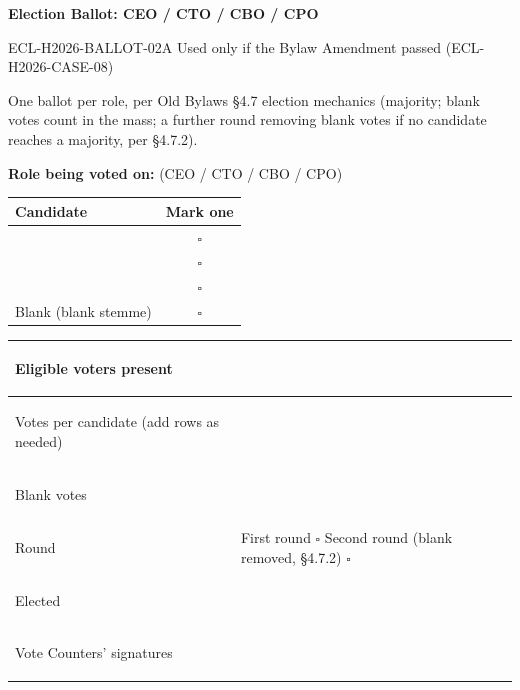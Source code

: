 \documentclass{../../../Common/Latex/Templates/rapport}
\date{[DATE OF GENERAL ASSEMBLY: TBD]}
\begin{document}
\reportmainmatter
\small
\setlength{\parindent}{0pt}
\setlength{\tabcolsep}{6pt}
\renewcommand{\arraystretch}{1.3}

\begin{center}
  {\Large\bfseries Election Ballot: CEO / CTO / CBO / CPO}\par
  \vspace{0.15cm}
  {\normalsize ECL-H2026-BALLOT-02A \quad Used only if the Bylaw Amendment passed (ECL-H2026-CASE-08)}\par
\end{center}

\vspace{0.2cm}
One ballot per role, per Old Bylaws \S4.7 election mechanics (majority; blank votes count in the mass; a further round removing blank votes if no candidate reaches a majority, per \S4.7.2).

\vspace{0.3cm}
\textbf{Role being voted on:} \underline{\hspace{6cm}} \quad (CEO / CTO / CBO / CPO)

\vspace{0.4cm}
\begin{tabularx}{\textwidth}{|>{\raggedright\arraybackslash}X|c|}
  \hline
  \bfseries Candidate  & \bfseries Mark one \\
  \hline
  \rule{0pt}{0.9cm}    & $\square$          \\
  \hline
  \rule{0pt}{0.9cm}    & $\square$          \\
  \hline
  \rule{0pt}{0.9cm}    & $\square$          \\
  \hline
  Blank (blank stemme) & $\square$          \\
  \hline
\end{tabularx}

\vspace{0.6cm}
\begin{tabularx}{\textwidth}{|>{\bfseries\raggedright\arraybackslash}p{5.5cm}|X|}
  \hline
  Eligible voters present                  & \rule{0pt}{1.2cm}                                                                                             \\
  \hline
  Votes per candidate (add rows as needed) & \rule{0pt}{2.4cm}                                                                                             \\
  \hline
  Blank votes                              & \rule{0pt}{1.2cm}                                                                                             \\
  \hline
  Round                                    & \rule{0pt}{1.2cm}First round \quad $\square$ \quad\quad Second round (blank removed, \S4.7.2) \quad $\square$ \\
  \hline
  Elected                                  & \rule{0pt}{1.4cm}                                                                                             \\
  \hline
  Vote Counters' signatures                & \rule{0pt}{1.6cm}                                                                                             \\
  \hline
\end{tabularx}
\end{document}
